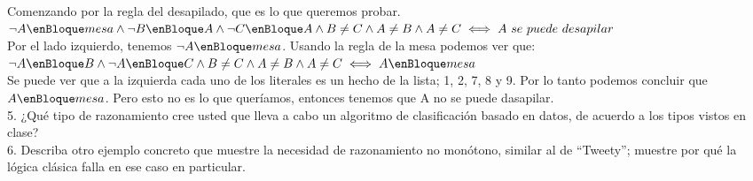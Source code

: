 Comenzando por la regla del desapilado, que es lo que queremos probar. \\ 

$\neg A \enBloque mesa \wedge \neg B \enBloque A \wedge \neg C \enBloque A \wedge B \neq C \wedge A \neq B \wedge A \neq C \iff A\ se\ puede\ desapilar$ \\

Por el lado izquierdo, tenemos $\neg A \enBloque mesa$. Usando la regla de la mesa podemos ver que: \\

$\neg A \enBloque B \wedge \neg A \enBloque C \wedge B \neq C \wedge A \neq B \wedge A \neq C \iff A \enBloque mesa$ \\

Se puede ver que a la izquierda cada uno de los literales es un hecho de la lista; 1, 2, 7, 8 y 9. Por lo tanto podemos concluir que $A \enBloque mesa$. Pero esto no es lo que queríamos, entonces tenemos que A no se puede dasapilar.\\


5. ¿Qué tipo de razonamiento cree usted que lleva a cabo un algoritmo de clasificación basado en datos, de acuerdo a los tipos vistos en clase?\\

6. Describa otro ejemplo concreto que muestre la necesidad de razonamiento no monótono, similar al de “Tweety”; muestre por qué la lógica clásica falla en ese caso en particular.


\bigskip